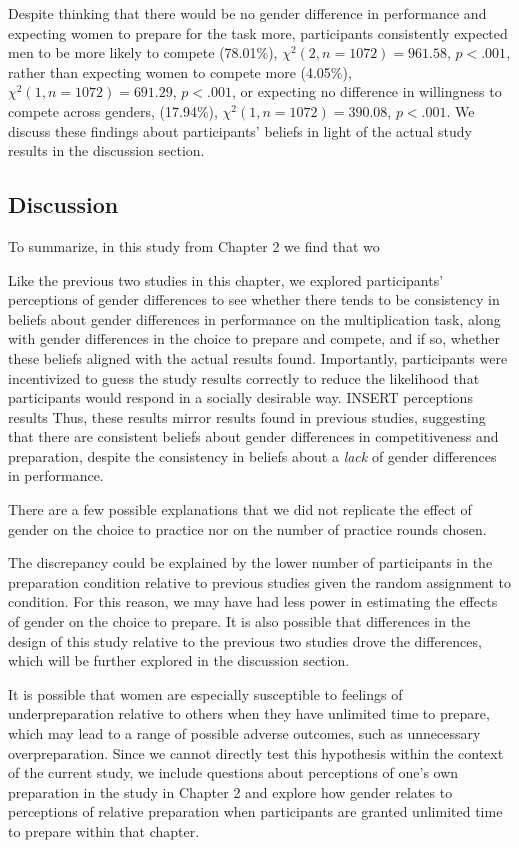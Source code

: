 \documentclass[a4paper,nobind]{templates/ociamthesis}
\begin{document}
Despite thinking that there would be no gender difference in performance and expecting women to prepare for the task more, participants consistently expected men to be more likely to compete (78.01\%), \(\chi^2(2, n = 1072) = 961.58\), \(p < .001\), rather than expecting women to compete more (4.05\%), \(\chi^2(1, n = 1072) = 691.29\), \(p < .001\), or expecting no difference in willingness to compete across genders, (17.94\%), \(\chi^2(1, n = 1072) = 390.08\), \(p < .001\). We discuss these findings about participants' beliefs in light of the actual study results in the discussion section.

\hypertarget{discussion-2}{%
\subsection{Discussion}\label{discussion-2}}

To summarize, in this study from Chapter 2 we find that wo

Like the previous two studies in this chapter, we explored participants' perceptions of gender differences to see whether there tends to be consistency in beliefs about gender differences in performance on the multiplication task, along with gender differences in the choice to prepare and compete, and if so, whether these beliefs aligned with the actual results found. Importantly, participants were incentivized to guess the study results correctly to reduce the likelihood that participants would respond in a socially desirable way.
INSERT perceptions results
Thus, these results mirror results found in previous studies, suggesting that there are consistent beliefs about gender differences in competitiveness and preparation, despite the consistency in beliefs about a \emph{lack} of gender differences in performance.

There are a few possible explanations that we did not replicate the effect of gender on the choice to practice nor on the number of practice rounds chosen.

The discrepancy could be explained by the lower number of participants in the preparation condition relative to previous studies given the random assignment to condition. For this reason, we may have had less power in estimating the effects of gender on the choice to prepare. It is also possible that differences in the design of this study relative to the previous two studies drove the differences, which will be further explored in the discussion section.

It is possible that women are especially susceptible to feelings of underpreparation relative to others when they have unlimited time to prepare, which may lead to a range of possible adverse outcomes, such as unnecessary overpreparation. Since we cannot directly test this hypothesis within the context of the current study, we include questions about perceptions of one's own preparation in the study in Chapter 2 and explore how gender relates to perceptions of relative preparation when participants are granted unlimited time to prepare within that chapter.
\end{document}
